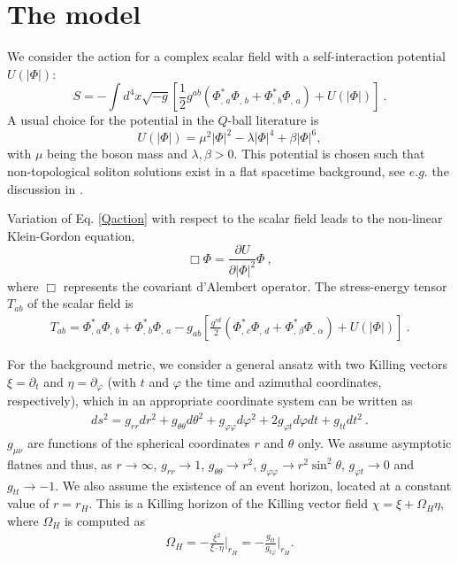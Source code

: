 \section{The model}



We consider the action for a complex scalar field with a self-interaction potential $U(\left| \Phi \right|)$:
\begin{equation}
\label{Qaction}
S=-\int d^4x\sqrt{-g} \left[ 
   \frac{1}{2} g^{ab}\left( \Phi_{, \, a}^* \Phi_{, \, b} + \Phi _
{, \, b}^* \Phi _{, \, a} \right) + U( \left| \Phi \right|) 
 \right] 
\ . 
\end{equation}
A usual choice for the potential in the $Q$-ball literature is 
\begin{equation}
U(|\Phi|) =  \mu^2 |\Phi|^2-\lambda |\Phi|^4 +\beta |\Phi|^6,
\label{QU} 
\end{equation}
with $\mu$ being the boson mass and $\lambda,\beta>0$.
This potential is chosen such that non-topological soliton solutions
exist in a flat spacetime background, see $e.g.$ the discussion in \cite{Volkov:2002aj}.

Variation of Eq. \eqref{Qaction} with respect to the scalar field
leads to the non-linear Klein-Gordon equation,
\begin{equation}
\label{KG}
 \Box\Phi= \frac{\partial U}{\partial\left|\Phi\right|^2}\Phi \ ,
\end{equation}
where $\Box$ represents the covariant d'Alembert operator.
%
%
The stress-energy tensor $T_{ab}$ of the scalar field is
\begin{eqnarray}
T_{ab} 
=  \Phi_{, \, a}^*\Phi_{, \, b}
+\Phi_{, \, b}^*\Phi_{, \, a} -g_{ab} \left[ \frac{g^{cd} }{2} 
\left( \Phi_{, \, c}^*\Phi_{, \, d}+
\Phi_{, \, \beta}^*\Phi_{, \, \alpha} \right)+U(|\Phi|)\right]
 \ .
\label{tmunu} 
\end{eqnarray}

For the background metric,
we consider a general 
ansatz with two Killing vectors   $\xi=\partial_t$ and $\eta=\partial_\varphi$ (with $t$ and $\varphi$
the time and azimuthal coordinates, respectively),
which in an appropriate coordinate system
can be written as
\begin{eqnarray}
\label{metric-ansatz}
ds^2= g_{rr}dr^2+g_{\theta \theta} d\theta^2 +g_{\varphi\varphi}d\varphi^2+2 g_{\varphi t}d\varphi dt +g_{tt} dt^2 \ .
\end{eqnarray}
$g_{\mu\nu}$ 
are functions of the spherical coordinates $r$ and $\theta$ only. We assume asymptotic flatnes and thus, as $r\to \infty$, $g_{rr} \to 1$,
$g_{\theta \theta} \to r^2$,
$g_{\varphi\varphi} \to r^2\sin^2 \theta$,
$g_{\varphi t} \to 0$
and
$g_{tt} \to -1$.
We also assume the existence of an event horizon, located
at a constant value of $r=r_H$.
This 
is a Killing horizon of the Killing vector field
$\chi=\xi+\Omega_H \eta$,
where $\Omega_H$ is computed as
\begin{eqnarray}
\label{OmegaH}
\Omega_H=-\frac{\xi^2}{\xi \cdot \eta}\bigg |_{r_H}=-\frac{g_{tt}}{g_{t\varphi}}\bigg |_{r_H}.
\end{eqnarray}


